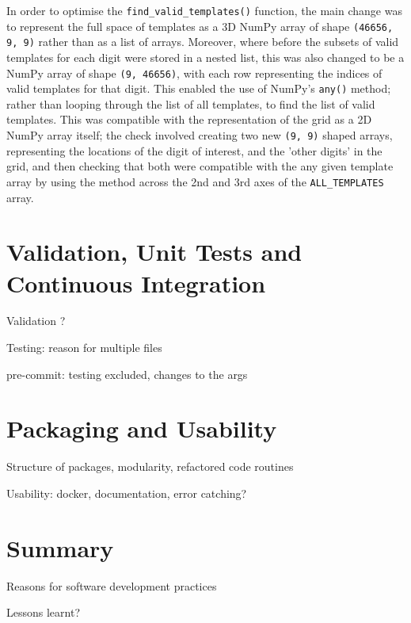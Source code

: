 \documentclass[12pt]{article}
\begin{document}
In order to optimise the \texttt{find\_valid\_templates()} function, the main change was to represent the full space of templates as a 3D NumPy array of shape \texttt{(46656, 9, 9)} rather than as a list of arrays.
Moreover, where before the subsets of valid templates for each digit were stored in a nested list, this was also changed to be a NumPy array of shape \texttt{(9, 46656)}, with each row representing the indices of valid templates for that digit.
This enabled the use of NumPy's \texttt{any()} method; rather than looping through the list of all templates, to find the list of valid templates.
This was compatible with the representation of the grid as a 2D NumPy array itself; the check involved creating two new \texttt{(9, 9)} shaped arrays, representing the locations of the digit of interest, and the 'other digits' in the grid, and then checking that both were compatible with the any given template array by using the  method across the 2nd and 3rd axes of the \texttt{ALL\_TEMPLATES} array.

\section*{Validation, Unit Tests and Continuous Integration}

Validation ?

Testing: reason for multiple files

pre-commit: testing excluded, changes to the args

\section*{Packaging and Usability}

Structure of packages, modularity, refactored code routines

Usability: docker, documentation, error catching?

\section*{Summary}

Reasons for software development practices

Lessons learnt?


\end{document}
